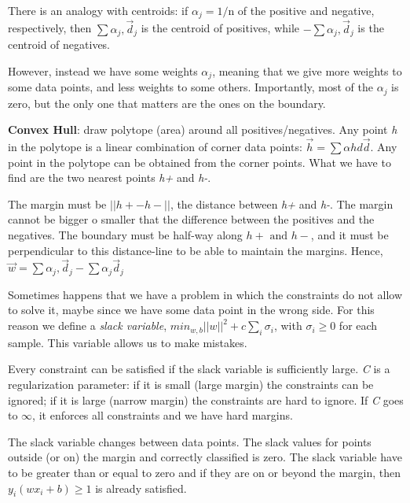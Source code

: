 \documentclass{article}
\begin{document}
\bigskip

There is an analogy with centroids: if \(\alpha_j = 1/\)n of the positive and negative, respectively, then \( \sum \alpha_j, \vec{d}_j\) is the centroid of positives, while \(- \sum \alpha_j, \vec{d}_j\) is the centroid of negatives.

However, instead we have some weights \(\alpha_j\), meaning that we give more weights to some data points, and less weights to some others. Importantly, most of the $\alpha_j$ is zero, but the only one that matters are the ones on the boundary.

\bigskip

\textbf{Convex Hull}: draw polytope (area) around all positives/negatives. Any point \emph{h} in the polytope is a linear combination of corner data points: \(\vec{h} = \sum \alpha{hd} \vec{d}\). Any point in the polytope can be obtained from the corner points. What we have to find are the two nearest points \emph{h+} and \emph{h-}. 

The margin must be \(||h+ - h-||\), the distance between \emph{h+} and \emph{h-}. The margin cannot be bigger o smaller that the difference between the positives and the negatives. The boundary must be half-way along \(h+ \text{ and } h-\), and it must be perpendicular to this distance-line to be able to maintain the margins. Hence, \(\vec{w} = \sum \alpha_j, \vec{d}_j - \sum \alpha_j\vec{d}_j\)
	
\bigskip 

Sometimes happens that we have a problem in which the constraints do not allow to solve it, maybe since we have some data point in the wrong side. For this reason we define a \emph{slack variable}, \(min_{w, b} ||w||^2 + c\sum_i \sigma_i\), with $\sigma_i \geq 0$ for each sample. This variable allows us to make mistakes.


Every constraint can be satisfied if the slack variable is sufficiently large. \emph{C} is a regularization parameter: if it is small (large margin) the constraints can be ignored; if it is large (narrow margin) the constraints are hard to ignore. If \emph{C} goes to $\infty$, it enforces all constraints and we have hard margins.

The slack variable changes between data points. The slack values for points outside (or on) the margin and correctly classified is zero. The slack variable have to be greater than or equal to zero and if they are on or beyond the margin, then \(y_i(wx_i + b) \geq 1\) is already satisfied. 
\end{document}
